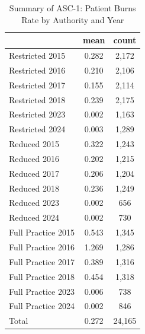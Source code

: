 \begin{table}[htbp]\centering
\def\sym#1{\ifmmode^{#1}\else\(^{#1}\)\fi}
\caption{Summary of ASC-1: Patient Burns Rate by Authority and Year}
\begin{tabular}{l*{1}{cc}}
\toprule
                    &        mean&       count\\
\midrule
Restricted 2015     &       0.282&       2,172\\
Restricted 2016     &       0.210&       2,106\\
Restricted 2017     &       0.155&       2,114\\
Restricted 2018     &       0.239&       2,175\\
Restricted 2023     &       0.002&       1,163\\
Restricted 2024     &       0.003&       1,289\\
Reduced 2015        &       0.322&       1,243\\
Reduced 2016        &       0.202&       1,215\\
Reduced 2017        &       0.206&       1,204\\
Reduced 2018        &       0.236&       1,249\\
Reduced 2023        &       0.002&         656\\
Reduced 2024        &       0.002&         730\\
Full Practice 2015  &       0.543&       1,345\\
Full Practice 2016  &       1.269&       1,286\\
Full Practice 2017  &       0.389&       1,316\\
Full Practice 2018  &       0.454&       1,318\\
Full Practice 2023  &       0.006&         738\\
Full Practice 2024  &       0.002&         846\\
Total               &       0.272&      24,165\\
\bottomrule
\end{tabular}
\end{table}
